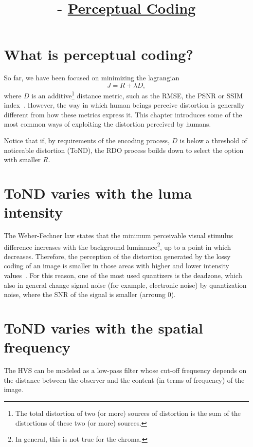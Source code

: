 

\title{\SM{} - \href{https://github.com/Sistemas-Multimedia/Sistemas-Multimedia.github.io/tree/master/contents/perceptual_coding}{Perceptual Coding}}

\maketitle
\tableofcontents

\section{What is perceptual coding?}

So far, we have been focused on minimizing the
lagrangian~\cite{sullivan1998rate}
\begin{equation}
  J = R + \lambda D,
\end{equation}
where $D$ is an additive\footnote{The total distortion of two (or
  more) sources of distortion is the sum of the distortions of these
  two (or more) sources.} distance metric, such as the RMSE, the PSNR
or SSIM index~\cite{wang2004image}. However, the way in which human
beings perceive distortion is generally different from how these
metrics express it. This chapter introduces some of the most common
ways of exploiting the distortion perceived by humans.

Notice that if, by requirements of the encoding process, $D$ is below
a threshold of noticeable distortion (ToND), the RDO process boilds down to
select the option with smaller $R$.

\section{ToND varies with the luma intensity}

The Weber-Fechner law states that the minimum perceivable visual
stimulus difference increases with the background
luminance\footnote{In general, this is not true for the chroma.}, up
to a point in which decreases. Therefore, the perception of the
distortion generated by the lossy coding of an image is smaller in
those areas with higher and lower intensity
values~\cite{naccari2014perceptually}. For this reason, one of the
most used quantizers is the deadzone, which also in general change
signal noise (for example, electronic noise) by quantization noise,
where the SNR of the signal is smaller (arroung 0).

\section{ToND varies with the spatial frequency}
The HVS can be modeled as a low-pass filter whose cut-off frequency
depends on the distance between the observer and the content (in terms
of frequency) of the image.

